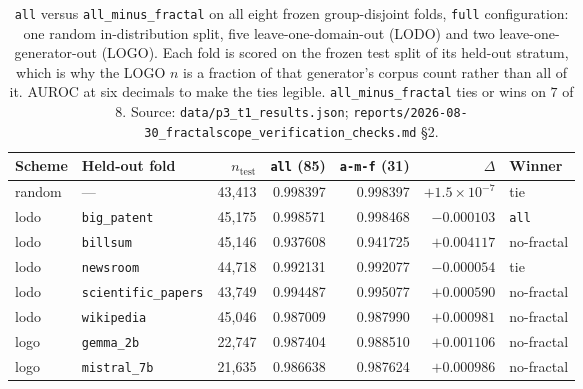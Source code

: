 \documentclass{article}
\newcommand{\arm}[1]{\texttt{#1}}
\begin{document}
\begin{table}[h]
\centering
\footnotesize
\caption{\arm{all} versus \arm{all\_minus\_fractal} on all eight frozen
group-disjoint folds, \arm{full} configuration: one random in-distribution
split, five leave-one-domain-out (LODO) and two leave-one-generator-out (LOGO).
Each fold is scored on the frozen test split of its held-out stratum, which is
why the LOGO $n$ is a fraction of that generator's corpus count rather than all
of it. AUROC at six decimals to make
the ties legible. \arm{all\_minus\_fractal} ties or wins on $7$ of $8$.
Source: \texttt{data/p3\_t1\_results.json};
\texttt{reports/2026-08-30\_fractalscope\_verification\_checks.md} \S2.}
\label{tab:folds}
\begin{tabular}{llrrrrl}
\toprule
Scheme & Held-out fold & $n_{\text{test}}$ & \arm{all} (85) & \arm{a-m-f} (31)
       & $\Delta$ & Winner \\
\midrule
random & ---                        & 43{,}413 & 0.998397 & 0.998397 & $+1.5\!\times\!10^{-7}$ & tie \\
lodo   & \texttt{big\_patent}       & 45{,}175 & 0.998571 & 0.998468 & $-0.000103$ & \arm{all} \\
lodo   & \texttt{billsum}           & 45{,}146 & 0.937608 & 0.941725 & $+0.004117$ & no-fractal \\
lodo   & \texttt{newsroom}          & 44{,}718 & 0.992131 & 0.992077 & $-0.000054$ & tie \\
lodo   & \texttt{scientific\_papers}& 43{,}749 & 0.994487 & 0.995077 & $+0.000590$ & no-fractal \\
lodo   & \texttt{wikipedia}         & 45{,}046 & 0.987009 & 0.987990 & $+0.000981$ & no-fractal \\
logo   & \texttt{gemma\_2b}         & 22{,}747 & 0.987404 & 0.988510 & $+0.001106$ & no-fractal \\
logo   & \texttt{mistral\_7b}       & 21{,}635 & 0.986638 & 0.987624 & $+0.000986$ & no-fractal \\
\bottomrule
\end{tabular}
\end{table}
\end{document}
